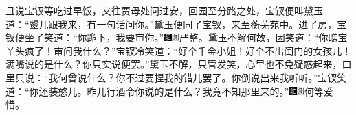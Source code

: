 且说宝钗等吃过早饭，又往贾母处问过安，回园至分路之处，宝钗便叫黛玉道：``颦儿跟我来，有一句话问你。''黛玉便同了宝钗，来至蘅芜苑中。进了房，宝钗便坐了笑道：``你跪下，我要审你。''{\includegraphics[width=3mm]{../Images/00006}\includegraphics[width=3mm]{../Images/00011}\footnotesize \kaishu 严整。}黛玉不解何故，因笑道：``你瞧宝丫头疯了！审问我什么？''宝钗冷笑道：``好个千金小姐！好个不出闺门的女孩儿！满嘴说的是什么？你只实说便罢。''黛玉不解，只管发笑，心里也不免疑惑起来，口里只说：``我何曾说什么？你不过要捏我的错儿罢了。你倒说出来我听听。''宝钗笑道：``你还装憨儿。昨儿行酒令你说的是什么？我竟不知那里来的。''{\includegraphics[width=3mm]{../Images/00006}\includegraphics[width=3mm]{../Images/00011}\footnotesize \kaishu 何等爱惜。}

